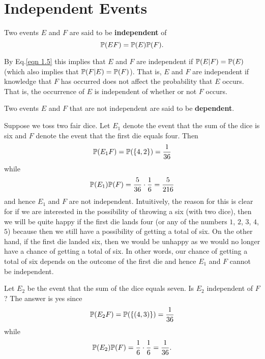 \section{Independent Events}

\begin{definition}
    Two events $E$ and $F$ are said to be \textbf{independent} of 
    \begin{equation*}
        \mathbb{P} (EF) = \mathbb{P} (E) \mathbb{P} (F).
    \end{equation*}
\end{definition}

\begin{remark}
    By Eq.\eqref{eqn 1.5} this implies that $E$ and $F$ are independent if $\mathbb{P} (E|F) = \mathbb{P} (E)$ (which also implies that $\mathbb{P} (F|E) = \mathbb{P} (F)$). That is, $E$ and $F$ are independent if knowledge that $F$ has occurred does not affect the probability that $E$ occurs. That is, the occurrence of $E$ is independent of whether or not $F$ occurs.
\end{remark}

\begin{definition}
    Two events $E$ and $F$ that are not independent are said to be \textbf{dependent}.
\end{definition}

\begin{example}
    Suppose we toss two fair dice. Let $E_1$ denote the event that the sum of the dice is six and $F$ denote the event that the first die equals four. Then
    \begin{equation*}
        \mathbb{P} (E_1 F) = \mathbb{P} (\{ 4, 2 \}) = \frac{1}{36} 
    \end{equation*}
    while 
    \begin{equation*}
        \mathbb{P}(E_1)\mathbb{P}(F) = \frac{5}{36} \cdot \frac{1}{6} = \frac{5}{216}
    \end{equation*}
    and hence $E_1$ and $F$ are not independent. Intuitively, the reason for this is clear for if we are interested in the possibility of throwing a six (with two dice), then we will be quite happy if the first die lands four (or any of the numbers $1$, $2$, $3$, $4$, $5$) because then we still have a possibility of getting a total of six. On the other hand, if the first die landed six, then we would be unhappy as we would no longer have a chance of getting a total of six. In other words, our chance of getting a total of six depends on the outcome of the first die and hence $E_1$ and $F$ cannot be independent.

    Let $E_2$ be the event that the sum of the dice equals seven. Is $E_2$ independent of $F$? The answer is yes since
    \begin{equation*}
        \mathbb{P} (E_2F) = \mathbb{P} (\{(4,3)\}) = \frac{1}{36}
    \end{equation*}
    while
    \begin{equation*}
        \mathbb{P}(E_2) \mathbb{P}(F) = \frac{1}{6} \cdot \frac{1}{6} = \frac{1}{36}.
    \end{equation*}
\end{example}

